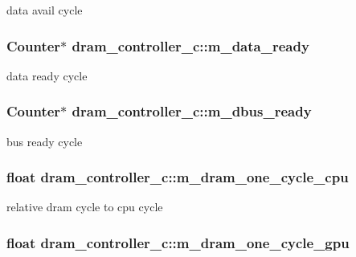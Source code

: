 \label{classdram__controller__c_a9ff45b23f89fb48e07a21253a28d5903}
data avail cycle \hypertarget{classdram__controller__c_a923a18758cbecc2b240c619309f82cdd}{
\subsubsection[{m\_\-data\_\-ready}]{\setlength{\rightskip}{0pt plus 5cm}Counter$\ast$ {\bf dram\_\-controller\_\-c::m\_\-data\_\-ready}}}
\label{classdram__controller__c_a923a18758cbecc2b240c619309f82cdd}
data ready cycle \hypertarget{classdram__controller__c_aeff0032fc196b65007b89d00499c2bd1}{
\subsubsection[{m\_\-dbus\_\-ready}]{\setlength{\rightskip}{0pt plus 5cm}Counter$\ast$ {\bf dram\_\-controller\_\-c::m\_\-dbus\_\-ready}}}
\label{classdram__controller__c_aeff0032fc196b65007b89d00499c2bd1}
bus ready cycle \hypertarget{classdram__controller__c_af929273981621d260089ba6187e73b38}{
\subsubsection[{m\_\-dram\_\-one\_\-cycle\_\-cpu}]{\setlength{\rightskip}{0pt plus 5cm}float {\bf dram\_\-controller\_\-c::m\_\-dram\_\-one\_\-cycle\_\-cpu}}}
\label{classdram__controller__c_af929273981621d260089ba6187e73b38}
relative dram cycle to cpu cycle \hypertarget{classdram__controller__c_a33c4f9781f46ee69715f6ab54b4eec46}{
\subsubsection[{m\_\-dram\_\-one\_\-cycle\_\-gpu}]{\setlength{\rightskip}{0pt plus 5cm}float {\bf dram\_\-controller\_\-c::m\_\-dram\_\-one\_\-cycle\_\-gpu}}}
